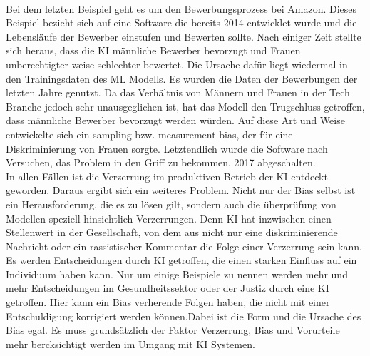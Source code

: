 \begin{onehalfspace}
        \\
        Bei dem letzten Beispiel geht es um den Bewerbungsprozess bei Amazon. Dieses Beispiel bezieht sich auf eine Software die bereits 2014 entwicklet wurde und die Lebensläufe der Bewerber einstufen und Bewerten sollte. Nach einiger Zeit stellte sich heraus, dass die \ac*{KI} männliche Bewerber bevorzugt und Frauen unberechtigter weise schlechter bewertet. Die Ursache dafür liegt wiedermal in den Trainingsdaten des \ac*{ML} Modells. Es wurden die Daten der Bewerbungen der letzten Jahre genutzt. Da das Verhältnis von Männern und Frauen in der Tech Branche jedoch sehr unausgeglichen ist, hat das Modell den Trugschluss getroffen, dass männliche Bewerber bevorzugt werden würden. Auf diese Art und Weise entwickelte sich ein sampling bzw. measurement bias, der für eine Diskriminierung von Frauen sorgte. Letztendlich wurde die Software nach Versuchen, das Problem in den Griff zu bekommen, 2017 abgeschalten.\cite{Cremers2019}\cite{IncidentDatabase2015_37}
        \\
        In allen Fällen ist die Verzerrung im produktiven Betrieb der \ac*{KI} entdeckt geworden. Daraus ergibt sich ein weiteres Problem. Nicht nur der Bias selbst ist ein Herausforderung, die es zu lösen gilt, sondern auch die überprüfung von Modellen speziell hinsichtlich Verzerrungen. Denn \ac*{KI} hat inzwischen einen Stellenwert in der Gesellschaft, von dem aus nicht nur eine diskriminierende Nachricht oder ein rassistischer Kommentar die Folge einer Verzerrung sein kann. Es werden Entscheidungen durch \ac*{KI} getroffen, die einen starken Einfluss auf ein Individuum haben kann. Nur um einige Beispiele zu nennen werden mehr und mehr Entscheidungen im Gesundheitssektor oder der Justiz durch eine \ac*{KI} getroffen. Hier kann ein Bias verherende Folgen haben, die nicht mit einer Entschuldigung korrigiert werden können.\cite{hagendorff2019maschinelles}Dabei ist die Form und die Ursache des Bias egal. Es muss grundsätzlich der Faktor Verzerrung, Bias und Vorurteile mehr bercksichtigt werden im Umgang mit \ac*{KI} Systemen.\cite{Drew2019}
    

\end{onehalfspace}
